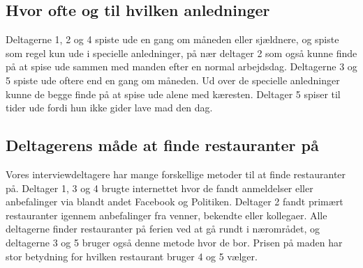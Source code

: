 \documentclass[a4paper, 12pt]{article}
\begin{document}
\subsection{Hvor ofte og til hvilken anledninger}

Deltagerne 1, 2 og 4 spiste ude en gang om måneden eller sjældnere, og spiste som regel
kun ude i specielle anledninger, på nær deltager 2 som også kunne finde på at spise ude
sammen med manden efter en normal arbejdsdag.
Deltagerne 3 og 5 spiste ude oftere end en gang om måneden. Ud over de specielle anledninger
kunne de begge finde på at spise ude alene med kæresten. Deltager 5 spiser til tider ude
fordi hun ikke gider lave mad den dag.



\subsection{Deltagerens måde at finde restauranter på}

Vores interviewdeltagere har mange forskellige metoder til at finde restauranter på.
Deltager 1, 3 og 4 brugte internettet hvor de fandt anmeldelser eller anbefalinger via
blandt andet Facebook og Politiken. Deltager 2 fandt primært restauranter igennem
anbefalinger fra venner, bekendte eller kollegaer. Alle deltagerne finder restauranter
på ferien ved at gå rundt i nærområdet, og deltagerne 3 og 5 bruger også denne
metode hvor de bor. Prisen på maden har stor betydning for hvilken restaurant bruger
4 og 5 vælger.

\end{document}
